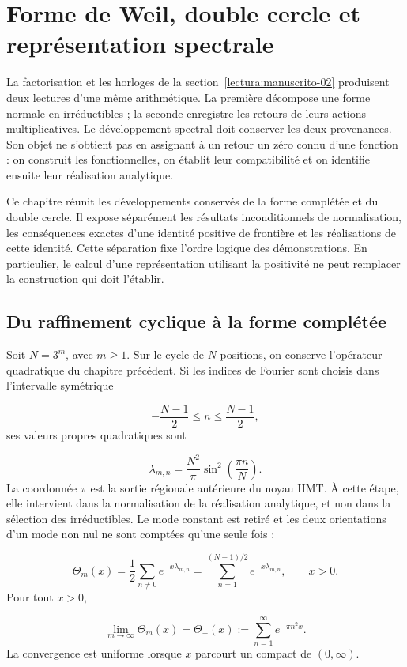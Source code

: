 \section{Forme de Weil, double cercle et représentation spectrale}
\label{lectura:manuscrito-03}
La factorisation et les horloges de la section~\ref{lectura:manuscrito-02} produisent deux lectures d’une même arithmétique. La première décompose une forme normale en irréductibles ; la seconde enregistre les retours de leurs actions multiplicatives. Le développement spectral doit conserver les deux provenances. Son objet ne s’obtient pas en assignant à un retour un zéro connu d’une fonction : on construit les fonctionnelles, on établit leur compatibilité et on identifie ensuite leur réalisation analytique.

Ce chapitre réunit les développements conservés de la forme complétée et du double cercle. Il expose séparément les résultats inconditionnels de normalisation, les conséquences exactes d'une identité positive de frontière et les réalisations de cette identité. Cette séparation fixe l'ordre logique des démonstrations. En particulier, le calcul d'une représentation utilisant la positivité ne peut remplacer la construction qui doit l'établir.

\subsection{Du raffinement cyclique à la forme complétée}
Soit \(N=3^m\), avec \(m\geq1\). Sur le cycle de \(N\) positions, on conserve l'opérateur quadratique du chapitre précédent. Si les indices de Fourier sont choisis dans l'intervalle symétrique

\[
-\frac{N-1}{2}\leq n\leq\frac{N-1}{2},
\]
ses valeurs propres quadratiques sont

\[
\lambda_{m,n}=\frac{N^2}{\pi}\sin^2\!\left(\frac{\pi n}{N}\right).
\]
La coordonnée \(\pi\) est la sortie régionale antérieure du noyau HMT. À cette étape, elle intervient dans la normalisation de la réalisation analytique, et non dans la sélection des irréductibles. Le mode constant est retiré et les deux orientations d'un mode non nul ne sont comptées qu'une seule fois :

\[
\Theta_m(x)=\frac12\sum_{n\neq0}e^{-x\lambda_{m,n}}
=\sum_{n=1}^{(N-1)/2}e^{-x\lambda_{m,n}},\qquad x>0.
\]
Pour tout \(x>0\),

\[
\lim_{m\to\infty}\Theta_m(x)
=\Theta_+(x):=\sum_{n=1}^{\infty}e^{-\pi n^2x}.
\]
La convergence est uniforme lorsque \(x\) parcourt un compact de \((0,\infty)\).

